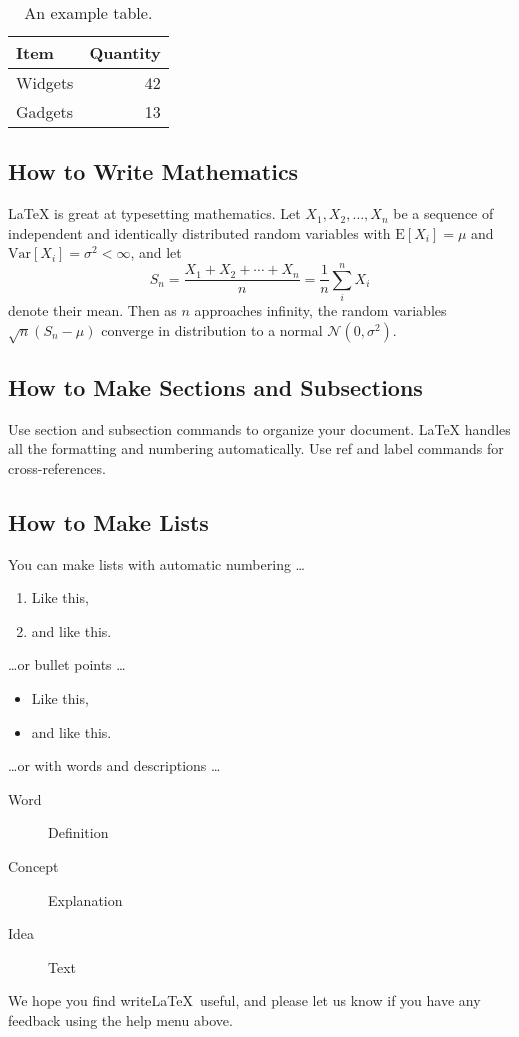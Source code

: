 \documentclass[a4paper]{article}
\begin{document}
\begin{table}
\centering
\begin{tabular}{l|r}
Item & Quantity \\\hline
Widgets & 42 \\
Gadgets & 13
\end{tabular}
\caption{\label{tab:widgets}An example table.}
\end{table}

\subsection{How to Write Mathematics}

\LaTeX{} is great at typesetting mathematics. Let $X_1, X_2, \ldots, X_n$ be a sequence of independent and identically distributed random variables with $\text{E}[X_i] = \mu$ and $\text{Var}[X_i] = \sigma^2 < \infty$, and let
$$S_n = \frac{X_1 + X_2 + \cdots + X_n}{n}
      = \frac{1}{n}\sum_{i}^{n} X_i$$
denote their mean. Then as $n$ approaches infinity, the random variables $\sqrt{n}(S_n - \mu)$ converge in distribution to a normal $\mathcal{N}(0, \sigma^2)$.

\subsection{How to Make Sections and Subsections}

Use section and subsection commands to organize your document. \LaTeX{} handles all the formatting and numbering automatically. Use ref and label commands for cross-references.

\subsection{How to Make Lists}

You can make lists with automatic numbering \dots

\begin{enumerate}
\item Like this,
\item and like this.
\end{enumerate}
\dots or bullet points \dots
\begin{itemize}
\item Like this,
\item and like this.
\end{itemize}
\dots or with words and descriptions \dots
\begin{description}
\item[Word] Definition
\item[Concept] Explanation
\item[Idea] Text
\end{description}

We hope you find write\LaTeX\ useful, and please let us know if you have any feedback using the help menu above.
\end{document}
